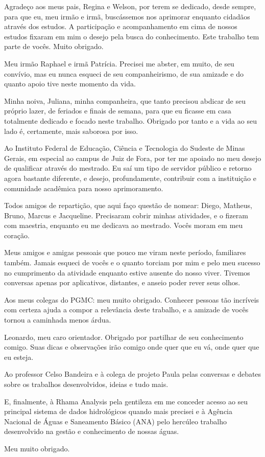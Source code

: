 \documentclass[
        oneside,      %
        english,			
        brazil			 
        ]{abntbibufjf}
\begin{document}
\begin{agradecimentos}
Agradeço aos meus pais, Regina e Welson, por terem se dedicado, desde sempre, para que eu, meu irmão e irmã, buscássemos nos aprimorar enquanto cidadãos através dos estudos. A participação e acompanhamento em cima de nossos estudos fixaram em mim o desejo pela busca do conhecimento. Este trabalho tem parte de vocês. Muito obrigado.

Meu irmão Raphael e irmã Patrícia. Precisei me abster, em muito, de seu convívio, mas eu nunca esqueci de seu companheirismo, de sua amizade e do quanto apoio tive neste momento da vida.

Minha noiva, Juliana, minha companheira, que tanto precisou abdicar de seu próprio lazer, de feriados e finais de semana, para que eu ficasse em casa totalmente dedicado e focado neste trabalho. Obrigado por tanto e a vida ao seu lado é, certamente, mais saborosa por isso.

Ao Instituto Federal de Educação, Ciência e Tecnologia do Sudeste de Minas Gerais, em especial ao campus de Juiz de Fora, por ter me apoiado no meu desejo de qualificar através do mestrado. Eu saí um tipo de servidor público e retorno agora bastante diferente, e desejo, profundamente, contribuir com a instituição e comunidade acadêmica para nosso aprimoramento.

Todos amigos de repartição, que aqui faço questão de nomear: Diego, Matheus, Bruno, Marcus e Jacqueline. Precisaram cobrir minhas atividades, e o fizeram com maestria, enquanto eu me dedicava ao mestrado. Vocês moram em meu coração.

Meus amigos e amigas pessoais que pouco me viram neste período, familiares também. Jamais esqueci de vocês e o quanto torciam por mim e pelo meu sucesso no cumprimento da atividade enquanto estive ausente do nosso viver. Tivemos conversas apenas por aplicativos, distantes, e anseio poder rever seus olhos.

Aos meus colegas do PGMC: meu muito obrigado. Conhecer pessoas tão incríveis com certeza ajuda a compor a relevância deste trabalho, e a amizade de vocês tornou a caminhada menos árdua.

Leonardo, meu caro orientador. Obrigado por partilhar de seu conhecimento comigo. Suas dicas e observações irão comigo onde quer que eu vá, onde quer que eu esteja.

Ao professor Celso Bandeira e à colega de projeto Paula pelas conversas e debates sobre os trabalhos desenvolvidos, ideias e tudo mais.

E, finalmente, à Rhama Analysis pela gentileza em me conceder acesso ao seu principal sistema de dados hidrológicos quando mais precisei e à Agência Nacional de Águas e Saneamento Básico (ANA) pelo hercúleo trabalho desenvolvido na gestão e conhecimento de nossas águas.

Meu muito obrigado.
\end{agradecimentos}
\end{document}
